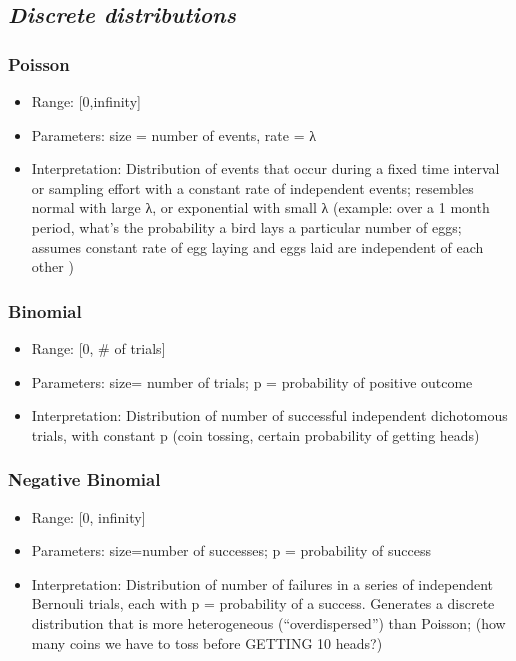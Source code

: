 \documentclass[]{article}
\providecommand{\tightlist}{%
  \setlength{\itemsep}{0pt}\setlength{\parskip}{0pt}}
\begin{document}
\subsection{\texorpdfstring{\textbf{\emph{Discrete
distributions}}}{Discrete distributions}}\label{discrete-distributions}

\subsubsection{\texorpdfstring{\textbf{Poisson}}{Poisson}}\label{poisson}

\begin{itemize}
\tightlist
\item
  Range: {[}0,infinity{]}
\item
  Parameters: size = number of events, rate = λ
\item
  Interpretation: Distribution of events that occur during a fixed time
  interval or sampling effort with a constant rate of independent
  events; resembles normal with large λ, or exponential with small λ
  (example: over a 1 month period, what's the probability a bird lays a
  particular number of eggs; assumes constant rate of egg laying and
  eggs laid are independent of each other )
\end{itemize}

\subsubsection{\texorpdfstring{\textbf{Binomial}}{Binomial}}\label{binomial}

\begin{itemize}
\tightlist
\item
  Range: {[}0, \# of trials{]}
\item
  Parameters: size= number of trials; p = probability of positive
  outcome
\item
  Interpretation: Distribution of number of successful independent
  dichotomous trials, with constant p (coin tossing, certain probability
  of getting heads)
\end{itemize}

\subsubsection{\texorpdfstring{\textbf{Negative
Binomial}}{Negative Binomial}}\label{negative-binomial}

\begin{itemize}
\tightlist
\item
  Range: {[}0, infinity{]}
\item
  Parameters: size=number of successes; p = probability of success
\item
  Interpretation: Distribution of number of failures in a series of
  independent Bernouli trials, each with p = probability of a success.
  Generates a discrete distribution that is more heterogeneous
  (``overdispersed'') than Poisson; (how many coins we have to toss
  before GETTING 10 heads?)
\end{itemize}
\end{document}
